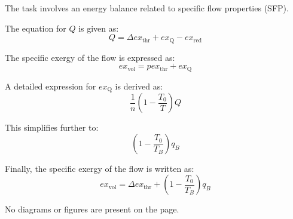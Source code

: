 The task involves an energy balance related to specific flow properties (SFP).  

The equation for \( Q \) is given as:  
\[
Q = \Delta ex_{\text{thr}} + ex_{\text{Q}} - ex_{\text{red}}
\]  

The specific exergy of the flow is expressed as:  
\[
ex_{\text{vol}} = p ex_{\text{thr}} + ex_{\text{Q}}
\]  

A detailed expression for \( ex_{\text{Q}} \) is derived as:  
\[
\frac{1}{n} \left( 1 - \frac{T_0}{T} \right) Q
\]  

This simplifies further to:  
\[
\left( 1 - \frac{T_0}{T_B} \right) q_B
\]  

Finally, the specific exergy of the flow is written as:  
\[
ex_{\text{vol}} = \Delta ex_{\text{thr}} + \left( 1 - \frac{T_0}{T_B} \right) q_B
\]  

No diagrams or figures are present on the page.